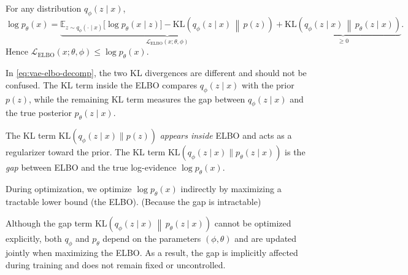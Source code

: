 \documentclass[../main]{subfiles}
\begin{document}
\begin{theorem}\label{thm:vae-elbo-decomp}
For any distribution $q_\phi(z\mid x)$,
\begin{equation}\label{eq:vae-elbo-decomp}
    \log p_\theta(x)
    =
    \underbrace{
    \mathbb E_{z\sim q_\phi(\cdot\mid x)}\!\bigl[\log p_\theta(x\mid z)\bigr]
    -
    \mathrm{KL}\!\left(q_\phi(z\mid x)\,\middle\|\,p(z)\right)
    }_{\mathcal L_{\mathrm{ELBO}}(x;\theta,\phi)}
    +
    \underbrace{
    \mathrm{KL}\!\left(q_\phi(z\mid x)\,\middle\|\,p_\theta(z\mid x)\right)
    }_{\ge 0}.
\end{equation}
Hence $\mathcal L_{\mathrm{ELBO}}(x;\theta,\phi)\le \log p_\theta(x)$.
\end{theorem}
\begin{remark}
    In \eqref{eq:vae-elbo-decomp}, the two KL divergences are different and should
    not be confused. The KL term inside the ELBO compares $q_\phi(z\mid x)$ with
    the prior $p(z)$, while the remaining KL term measures the gap between
    $q_\phi(z\mid x)$ and the true posterior $p_\theta(z\mid x)$.
\end{remark}

\begin{remark}
    The KL term \(\mathrm{KL}(q_\phi(z\mid x)\|p(z))\) \emph{appears inside} ELBO and acts as
    a regularizer toward the prior.  
    The KL term \(\mathrm{KL}(q_\phi(z\mid x)\|p_\theta(z\mid x))\) is the \emph{gap} between
    ELBO and the true log-evidence \(\log p_\theta(x)\).
\end{remark}
    During optimization, we 
    optimize $\log p_\theta(x)$ indirectly by maximizing a tractable lower bound
    (the ELBO). (Because the gap is intractable)

    Although the gap term $\mathrm{KL}\!\left(q_\phi(z\mid x)\,\middle\|\,p_\theta(z\mid x)\right)$
    cannot be optimized explicitly, both $q_\phi$ and $p_\theta$ depend on the
    parameters $(\phi,\theta)$ and are updated jointly when maximizing the ELBO.
    As a result, the gap is implicitly affected during training and does not
    remain fixed or uncontrolled.
\end{document}
